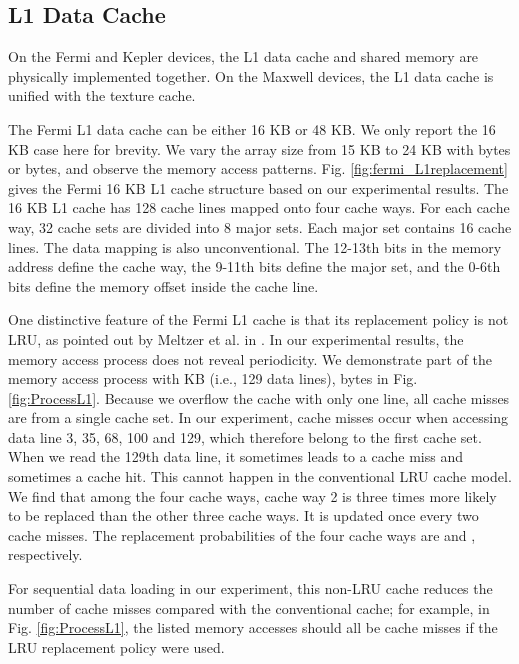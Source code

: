 \documentclass[10pt,journal,compsoc]{IEEEtran}
\theoremstyle{definition}
\begin{document}
\subsection{L1 Data Cache}
On the Fermi and Kepler devices, the L1 data cache and shared memory are physically implemented together. On the Maxwell devices, the L1 data cache is unified with the texture cache.

The Fermi L1 data cache can be either 16 KB or 48 KB. We only report the 16 KB case here for brevity. We vary the array size from 15 KB to 24 KB with  bytes or  bytes, and observe the memory access patterns. Fig. \ref{fig:fermi_L1replacement} gives the Fermi 16 KB L1 cache structure based on our experimental results. The 16 KB L1 cache has 128 cache lines mapped onto four cache ways. For each cache way, 32 cache sets are divided into 8 major sets. Each major set contains 16 cache lines. The data mapping is also unconventional. The 12-13th bits in the memory address define the cache way, the 9-11th bits define the major set, and the 0-6th bits define the memory offset inside the cache line.

One distinctive feature of the Fermi L1 cache is that its replacement policy is not LRU, as pointed out by Meltzer et al. in \cite{meltzer2013micro}. In our experimental results, the memory access process does not reveal periodicity. We demonstrate part of the memory access process with  KB (i.e., 129 data lines),  bytes in Fig. \ref{fig:ProcessL1}. Because we overflow the cache with only one line, all cache misses are from a single cache set. In our experiment, cache misses occur when accessing data line 3, 35, 68, 100 and 129, which therefore belong to the first cache set. When we read the 129th data line, it sometimes leads to a cache miss and sometimes a cache hit. This cannot happen in the conventional LRU cache model. We find that among the four cache ways, cache way 2 is three times more likely to be replaced than the other three cache ways. It is updated once every two cache misses. The replacement probabilities of the four cache ways are  and , respectively.

For sequential data loading in our experiment, this non-LRU cache reduces the number of cache misses compared with the conventional cache; for example, in Fig. \ref{fig:ProcessL1}, the listed memory accesses should all be cache misses if the LRU replacement policy were used.
\end{document}
